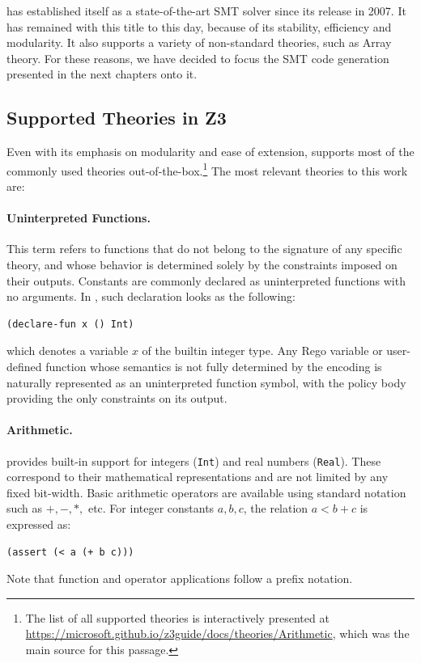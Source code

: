 \gap

\ziii has established itself as a state-of-the-art SMT solver since its release in 2007.
It has remained with this title to this day, because of its stability, efficiency and modularity.
It also supports a variety of non-standard theories, such as Array theory.
For these reasons, we have decided to focus the SMT code generation presented in the next chapters onto it.

\subsection{Supported Theories in Z3}

Even with its emphasis on modularity and ease of extension, \ziii supports most of
the commonly used theories out-of-the-box.\footnote{
  The list of all supported theories is interactively presented at
  \url{https://microsoft.github.io/z3guide/docs/theories/Arithmetic}, which was the
  main source for this passage.
}
The most relevant theories to this work are:

\paragraph{Uninterpreted Functions.}
This term refers to functions that do not belong to the signature of any specific
theory, and whose behavior is determined solely by the constraints imposed on their
outputs.
Constants are commonly declared as uninterpreted functions with no arguments.
In \smtlib, such declaration looks as the following:
\begin{lstlisting}[language=SMT]
(declare-fun x () Int)
\end{lstlisting}
which denotes a variable $x$ of the builtin integer type.
Any Rego variable or user-defined function whose semantics is not fully determined
by the encoding is naturally represented as an uninterpreted function symbol,
with the policy body providing the only constraints on its output.

\paragraph{Arithmetic.}
\ziii provides built-in support for integers (\texttt{Int}) and real numbers (\texttt{Real}).
These correspond to their mathematical representations and are not limited by any fixed bit-width.
Basic arithmetic operators are available using standard notation such as
$+, -, *,$ etc.
For integer constants $a, b, c$, the relation $a < b + c$ is expressed as:
\begin{lstlisting}[language=SMT]
(assert (< a (+ b c)))
\end{lstlisting}
Note that function and operator applications follow a prefix notation.

